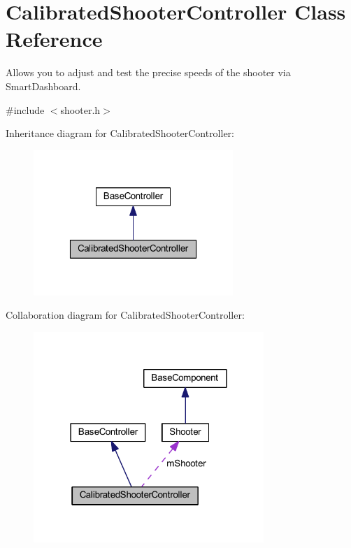 \hypertarget{class_calibrated_shooter_controller}{\section{\-Calibrated\-Shooter\-Controller \-Class \-Reference}
\label{class_calibrated_shooter_controller}
}


\-Allows you to adjust and test the precise speeds of the shooter via \-Smart\-Dashboard.  




{\ttfamily \#include $<$shooter.\-h$>$}



\-Inheritance diagram for \-Calibrated\-Shooter\-Controller\-:\nopagebreak
\begin{figure}[H]
\begin{center}
\leavevmode
\includegraphics[width=214pt]{class_calibrated_shooter_controller__inherit__graph}
\end{center}
\end{figure}


\-Collaboration diagram for \-Calibrated\-Shooter\-Controller\-:\nopagebreak
\begin{figure}[H]
\begin{center}
\leavevmode
\includegraphics[width=247pt]{class_calibrated_shooter_controller__coll__graph}
\end{center}
\end{figure}
